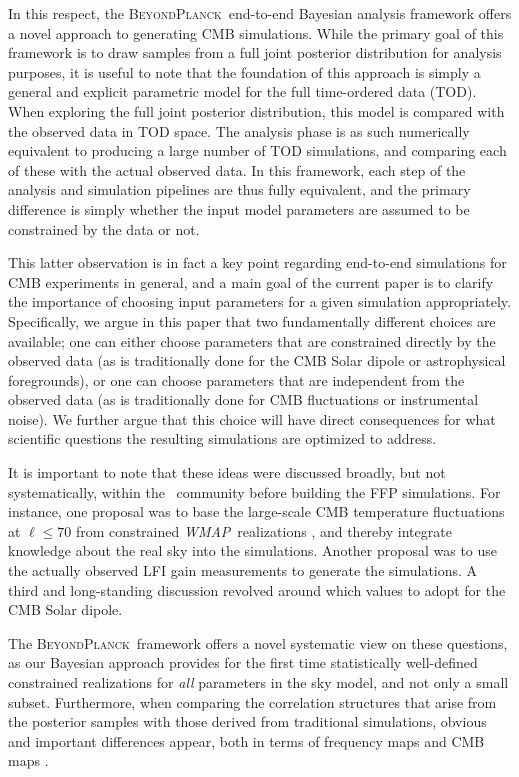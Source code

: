 \documentclass[twocolumn]{aa}%
\def\WMAP{\emph{WMAP}}
\newcommand{\BP}{\textsc{BeyondPlanck}}
\begin{document}
In this respect, the \BP\ end-to-end Bayesian analysis framework
\citep{bp01} offers a novel approach to generating CMB
simulations. While the primary goal of this framework is to draw
samples from a full joint posterior distribution for analysis
purposes, it is useful to note that the foundation of this approach is
simply a general and explicit parametric model for the full
time-ordered data (TOD). When exploring the full joint posterior
distribution, this model is compared with the observed data in TOD
space. The analysis phase is as such numerically equivalent to
producing a large number of TOD simulations, and comparing each of
these with the actual observed data. In this framework, each step of
the analysis and simulation pipelines are thus fully equivalent, and
the primary difference is simply whether the input model parameters
are assumed to be constrained by the data or not.

This latter observation is in fact a key point regarding end-to-end
simulations for CMB experiments in general, and a main goal of the
current paper is to clarify the importance of choosing input
parameters for a given simulation appropriately. Specifically, we
argue in this paper that two fundamentally different choices are
available; one can either choose parameters that are constrained
directly by the observed data (as is traditionally done for the CMB
Solar dipole or astrophysical foregrounds), or one can choose
parameters that are independent from the observed data (as is
traditionally done for CMB fluctuations or instrumental noise). We
further argue that this choice will have direct consequences for what
scientific questions the resulting simulations are optimized to
address.

It is important to note that these ideas were discussed broadly, but
not systematically, within the \Planck\ community before building the
FFP simulations. For instance, one proposal was to base the
large-scale CMB temperature fluctuations at $\ell\le70$ from
constrained \WMAP\ realizations \citep{bennett2012}, and thereby
integrate knowledge about the real sky into the simulations. Another
proposal was to use the actually observed LFI gain measurements to
generate the simulations. A third and long-standing discussion
revolved around which values to adopt for the CMB Solar dipole.

The \BP\ framework offers a novel systematic view on these questions,
as our Bayesian approach provides for the first time
statistically well-defined constrained realizations for \emph{all}
parameters in the sky model, and not only a small subset. Furthermore,
when comparing the correlation structures that arise from the
posterior samples with those derived from traditional simulations,
obvious and important differences appear, both in terms of frequency
maps \citep{bp10} and CMB maps \citep{bp11}. 
\end{document}
